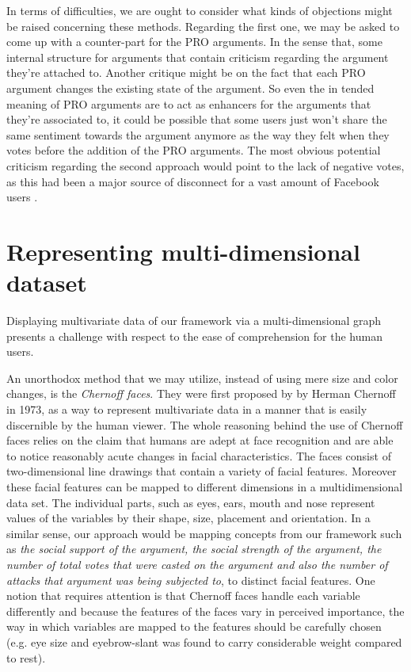 \documentclass{article}
\begin{document}
In terms of difficulties, we are ought to consider what kinds of objections might be raised concerning these methods. Regarding the first one, we may be asked to come up with a counter-part for the PRO arguments. In the sense that,  some internal structure for arguments that contain criticism regarding the argument they're attached to. Another critique might be on the fact that each PRO argument changes the existing state of the argument. So even the in tended meaning of PRO arguments are to act as enhancers for the arguments that they're associated to, it could be possible that some users just won't share the same sentiment towards the argument anymore as the way they felt when they votes before the addition of the PRO arguments. The most obvious potential criticism regarding the second approach would point to the lack of negative votes, as this had been a major source of disconnect for a vast amount of Facebook users \cite{FBdislike}.

\section{Representing multi-dimensional dataset} 
Displaying multivariate data of our framework via a multi-dimensional graph presents a challenge with respect to the ease of comprehension for the human users.

An unorthodox method that we may utilize, instead of using mere size and color changes, is the \textit{Chernoff faces}. They were first proposed by by Herman Chernoff \cite{Chernoff73} in 1973, as a way to represent multivariate data in a manner that is easily discernible by the human viewer.  The whole reasoning behind the use of Chernoff faces relies on the claim that humans are adept at face recognition and are able to notice reasonably acute changes in facial characteristics. The faces consist of two-dimensional line drawings that contain a variety of facial features. Moreover these facial features can be mapped to different dimensions in a multidimensional data set. The individual parts, such as eyes, ears, mouth and nose represent values of the variables by their shape, size, placement and orientation. In a similar sense, our approach would be mapping concepts from our framework such as  \textit{the social support of the argument, the social strength of the argument, the number of total votes that were casted on the argument and also the number of attacks that argument was being subjected to}, to distinct facial features. One notion that requires attention is that Chernoff faces handle each variable differently and because the features of the faces vary in perceived importance, the way in which variables are mapped to the features should be carefully chosen (e.g. eye size and eyebrow-slant was found to carry considerable weight compared to rest).
\end{document}
